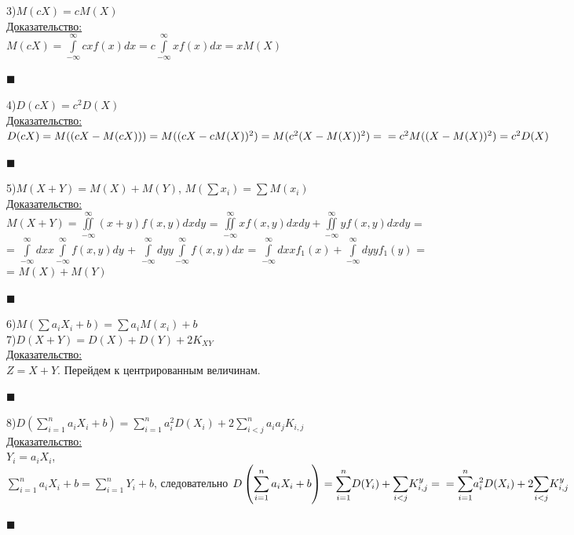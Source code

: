 \documentclass[russian, 12pt, fleqn]{article}
\begin{document}
3)$M(cX) = cM(X)$\\
\underline{Доказательство:}\\
$M(cX) = \displaystyle{\int\limits_{-\infty} ^{\infty}} c x f(x) dx = c \displaystyle{\int \limits_{-\infty} ^{\infty}} x f(x) dx = xM(X)$
\begin{flushright}\(\blacksquare\)\end{flushright}
4)$D(cX) = c^2 D(X)$\\
\underline{Доказательство:}\\
$D(cX)=M((cX - M(cX))) = M((cX - c M(X))^2) = M(c^2(X-M(X))^2) =\\= c^2M((X-M(X))^2) = c^2 D(X)$
\begin{flushright}\(\blacksquare\)\end{flushright}
5)$M(X+Y) = M(X) + M(Y)$,  $M(\sum x_i) = \sum M(x_i)$\\
\underline{Доказательство:}\\
$M(X + Y) =  \displaystyle{\iint \limits_{-\infty} ^{\infty}} (x+y)f(x,y) dxdy$ = $\displaystyle{\iint \limits_{-\infty} ^{\infty}} xf(x,y) dxdy + \displaystyle{\iint \limits_{-\infty} ^{\infty}} yf(x,y) dxdy$ =\\= $\displaystyle{\int\limits_{-\infty}^{\infty} } dx x \displaystyle{\int\limits_{-\infty}^{\infty} } f(x, y) dy $ +  $\displaystyle{\int\limits_{-\infty}^{\infty} } dy y \displaystyle{\int\limits_{-\infty}^{\infty} } f(x, y) dx $ = $\displaystyle{\int\limits_{-\infty}^{\infty} } dx x f_1(x) + \displaystyle{\int\limits_{-\infty}^{\infty} } dyy f_1(y)$ =\\= $M(X) + M(Y)$
\begin{flushright}\(\blacksquare\)\end{flushright}
6)$M(\sum \limits a_i X_i + b) = \sum \limits a_i M(x_i) + b$\\
7)$D(X + Y) = D(X) + D(Y) + 2 K_{XY}$\\
\underline{Доказательство:}\\
$Z=X+Y$. Перейдем к центрированным величинам.
\begin{flushright}\(\blacksquare\)\end{flushright}
8)$\displaystyle{D\left (\sum_{i = 1}^{n}a_iX_i + b\right )} =  \displaystyle{\sum_{i = 1}^{n}}  a_i^2 D(X_i) + 2 \displaystyle{\sum_{i <j}^{n}}a_ia_jK_{i,j}$\\
\underline{Доказательство:}\\
$Y_i = a_i X_i$,\\
 $ \displaystyle{\sum_{i = 1}^{n}}a_iX_i + b =  \displaystyle{\sum_{i = 1}^{n}}Y_i + b$, следовательно  $\displaystyle{D\left (\sum_{i = 1}^{n}a_iX_i + b\right )}  = \displaystyle{\sum_{i = 1}^{n}} D(Y_i) + \displaystyle{\sum_{i < j}^{}} K_{i,j} ^y =\\= \displaystyle{\sum_{i = 1}^{n}}a_i^2D(X_i) + 2 \displaystyle{\sum_{i  < j}} K_{i,j}^{y}$
\begin{flushright}\(\blacksquare\)\end{flushright}
\end{document}
